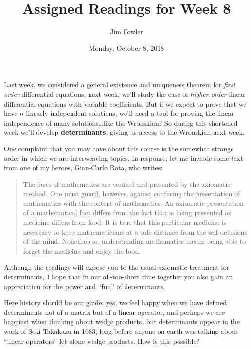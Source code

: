 \documentclass{homework}
\author{Jim Fowler}
\title{Assigned Readings for Week 8}
\date{Monday, October 8, 2018}
\begin{document}
\maketitle

Last week, we considered a general existence and uniqueness theorem
for \textit{first order} differential equations; next week, we'll
study the case of \textit{higher order} linear differential equations
with variable coefficients.  But if we expect to prove that we have
$n$ linearly independent solutions, we'll need a tool for proving the
linear independence of many solutions\ldots like the Wronskian?  So
during this shortened week we'll develop \textbf{determinants}, giving
us access to the Wronskian next week.

One complaint that you may have about this course is the somewhat
strange order in which we are interweaving topics.  In response, let
me include some text from one of my heroes, Gian-Carlo Rota, who
writes:
\begin{quote}
  The facts of mathematics are verified and presented by the axiomatic
  method. One must guard, however, against confusing the presentation
  of mathematics with the content of mathematics. An axiomatic
  presentation of a mathematical fact differs from the fact that is
  being presented as medicine differs from food. It is true that this
  particular medicine is necessary to keep mathematicians at a safe
  distance from the self-delusions of the mind. Nonetheless,
  understanding mathematics means being able to forget the medicine
  and enjoy the food.
\end{quote}
Although the readings will expose you to the usual axiomatic treatment
for determinants, I hope that in our all-too-short time together you
also gain an appreciation for the power and ``fun'' of determinants.

Here history should be our guide: yes, we feel happy when we have
defined determinants not of a matrix but of a linear operator, and
perhaps we are happiest when thinking about wedge products\ldots but
determinants appear in the work of Seki Takakazu in 1683, long before
anyone on earth was talking about ``linear operators'' let alone wedge
products.  How is this possible?

\end{document}
